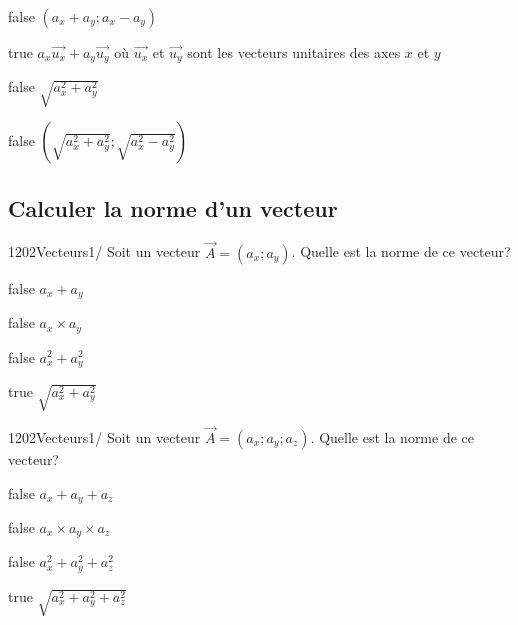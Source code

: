 \documentclass[11pt]{article}
\begin{document}
            \begin{reponses}
            	\item[false] $(a_x+a_y;a_x-a_y)$
            	\item[true] $a_x\vec{u_x}+a_y\vec{u_y}$ où $\vec{u_x}$ et $\vec{u_y}$ sont les vecteurs unitaires des axes $x$ et $y$
                \item[false] $\sqrt{a_{x}^2+a_{y}^2}$
                \item[false] $(\sqrt{a_{x}^2+a_{y}^2};\sqrt{a_{x}^2-a_{y}^2})$
            \end{reponses}

        \subsection{Calculer la norme d'un vecteur}
        
        	\begin{question}{1202}{Vecteurs}{1}{/}
				Soit un vecteur $\vec{A}=(a_x;a_y)$. Quelle est la norme de ce vecteur?
            \end{question}

            \begin{reponses}
            	\item[false] $a_x+a_y$
            	\item[false] $a_x\times a_y$
                \item[false] $a_{x}^2+a_{y}^2$
                \item[true] $\sqrt{a_{x}^2+a_{y}^2}$
            \end{reponses}
        
        	\begin{question}{1202}{Vecteurs}{1}{/}
				Soit un vecteur $\vec{A}=(a_x;a_y;a_z)$. Quelle est la norme de ce vecteur?
            \end{question}

            \begin{reponses}
            	\item[false] $a_x+a_y+a_z$
            	\item[false] $a_x\times a_y\times a_z$
                \item[false] $a_{x}^2+a_{y}^2+a_{z}^2$
                \item[true] $\sqrt{a_{x}^2+a_{y}^2+a_{z}^2}$
            \end{reponses}
\end{document}
